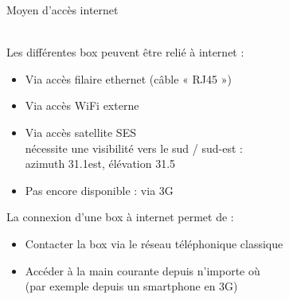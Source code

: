 \documentclass{beamer}
\begin{document}
\begin{frame}
    \begin{huge}Moyen d’accès internet\end{huge}
    \vspace{0.5cm}
    \\
    Les différentes box peuvent être relié à internet :
    \begin{itemize}
        \item Via accès filaire ethernet (câble « RJ45 »)
        \item Via accès WiFi externe
        \item Via accès satellite SES\\
            nécessite une visibilité vers le sud / sud-est :\\
            azimuth 31.1\degre est, élévation 31.5\degre
        \item Pas encore disponible : via 3G
    \end{itemize}
    La connexion d’une box à internet permet de :
    \begin{itemize}
        \item Contacter la box via le réseau téléphonique classique
        \item Accéder à la main courante depuis n’importe où\\
            (par exemple depuis un smartphone en 3G)
    \end{itemize}
\end{frame}
\end{document}

